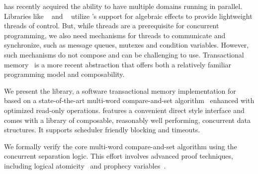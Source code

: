 \OCaml has recently acquired the ability to have multiple domains running in parallel.
Libraries like \Eio~\cite{eio} and \Domainslib~\cite{domainslib} utilize \OCaml’s support for algebraic effects to provide lightweight threads of control.
But, while threads are a prerequisite for concurrent programming, we also need mechanisms for threads to communicate and synchronize, such as message queues, mutexes and condition variables.
However, such mechanisms do not compose and can be challenging to use.
Transactional memory~\cite{DBLP:conf/podc/ShavitT95} is a more recent abstraction that offers both a relatively familiar programming model and composability.

We present the \Kcas library, a software transactional memory implementation for \OCaml based on a state-of-the-art multi-word compare-and-set algorithm~\cite{DBLP:conf/wdag/GuerraouiKMZ20} enhanced with optimized read-only operations.
\Kcas features a convenient direct style interface and comes with a library of composable, reasonably well performing, concurrent data structures.
It supports scheduler friendly blocking and timeouts.

We formally verify the core multi-word compare-and-set algorithm using the \Iris~\cite{DBLP:journals/jfp/JungKJBBD18} concurrent separation logic.
This effort involves advanced proof techniques, including logical atomicity~\cite{DBLP:conf/popl/JacobsP11} and prophecy variables~\cite{DBLP:journals/pacmpl/JungLPRTDJ20}.